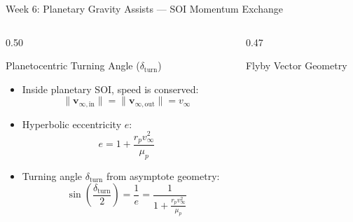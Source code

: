 \documentclass[aspectratio=169, 10pt]{beamer}
\begin{document}
\begin{frame}{Week 6: Planetary Gravity Assists --- SOI Momentum Exchange}
    \begin{columns}[t]
        \begin{column}{0.50\textwidth}
            \begin{block}{Planetocentric Turning Angle ($\delta_{\text{turn}}$)}
                \scriptsize
                \begin{itemize}\setlength{\itemsep}{1.5pt}
                    \item Inside planetary SOI, speed is conserved:
                    \vspace{-0.05cm}
                    \begin{equation*}
                        \|\mathbf{v}_{\infty,\text{in}}\| = \|\mathbf{v}_{\infty,\text{out}}\| = v_\infty
                    \end{equation*}
                    \vspace{-0.15cm}
                    \item Hyperbolic eccentricity $e$:
                    \vspace{-0.05cm}
                    \begin{equation*}
                        e = 1 + \frac{r_p v_\infty^2}{\mu_p}
                    \end{equation*}
                    \vspace{-0.15cm}
                    \item Turning angle $\delta_{\text{turn}}$ from asymptote geometry:
                    \vspace{-0.05cm}
                    \begin{equation*}
                        \sin\left(\frac{\delta_{\text{turn}}}{2}\right) = \frac{1}{e} = \frac{1}{1 + \frac{r_p v_\infty^2}{\mu_p}}
                    \end{equation*}
                \end{itemize}
            \end{block}
        \end{column}

        \begin{column}{0.47\textwidth}
            \begin{block}{Flyby Vector Geometry}
                \centering
\end{block}
\end{column}
\end{columns}
\end{frame}
\end{document}

